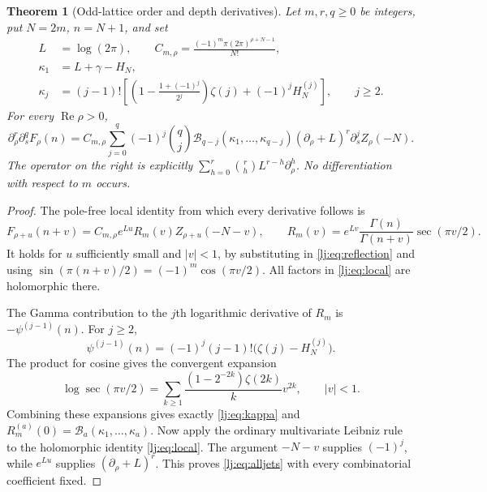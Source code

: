 \documentclass[11pt,a4paper]{article}
\numberwithin{equation}{section}
\newtheorem{theorem}{Theorem}[section]
\theoremstyle{definition}
\theoremstyle{remark}
\DeclareMathOperator{\re}{Re}
\begin{document}
\begin{theorem}[Odd-lattice order and depth derivatives]
\label{lj:thm:oddjets}
Let $m,r,q\geq0$ be integers, put $N=2m$, $n=N+1$, and set
\begin{align}
 L&=\log(2\pi),\qquad
 C_{m,\rho}=\frac{(-1)^m\pi(2\pi)^{\rho+N-1}}{N!},
 \label{lj:eq:C}\\
 \kappa_1&=L+\gamma-H_N,\nonumber\\
 \kappa_j&=(j-1)!\left[
       \left(1-\frac{1+(-1)^j}{2^j}\right)\zeta(j)
       +(-1)^jH_N^{(j)}\right],\qquad j\geq2.
 \label{lj:eq:kappa}
\end{align}
For every $\re\rho>0$,
\begin{equation}
 \boxed{\displaystyle
 \partial_\rho^r\partial_s^qF_\rho(n)
 =C_{m,\rho}\sum_{j=0}^q(-1)^j\binom qj
       \mathcal B_{q-j}(\kappa_1,\ldots,\kappa_{q-j})
       (\partial_\rho+L)^r\partial_s^jZ_\rho(-N).}
 \label{lj:eq:alljets}
\end{equation}
The operator on the right is explicitly
$\sum_{h=0}^r\binom rh L^{r-h}\partial_\rho^h$.
No differentiation with respect to $m$ occurs.
\end{theorem}

\begin{proof}
The pole-free local identity from which every derivative follows is
\begin{equation}
 F_{\rho+u}(n+v)=C_{m,\rho}e^{Lu}
       R_m(v)Z_{\rho+u}(-N-v),
 \qquad
 R_m(v)=e^{Lv}\frac{\Gamma(n)}{\Gamma(n+v)}
                  \sec(\pi v/2).
 \label{lj:eq:local}
\end{equation}
It holds for $u$ sufficiently small and $|v|<1$, by substituting in
\eqref{lj:eq:reflection} and using
$\sin(\pi(n+v)/2)=(-1)^m\cos(\pi v/2)$.
All factors in \eqref{lj:eq:local} are holomorphic there.

The Gamma contribution to the $j$th logarithmic derivative of $R_m$
is $-\psi^{(j-1)}(n)$. For $j\geq2$,
\[
 \psi^{(j-1)}(n)=(-1)^j(j-1)!
                         \bigl(\zeta(j)-H_N^{(j)}\bigr).
\]
The product for cosine gives the convergent expansion
\[
 \log\sec(\pi v/2)
   =\sum_{k\geq1}\frac{(1-2^{-2k})\zeta(2k)}{k}v^{2k},
   \qquad |v|<1.
\]
Combining these expansions gives exactly \eqref{lj:eq:kappa} and
$R_m^{(a)}(0)=\mathcal B_a(\kappa_1,\ldots,\kappa_a)$.
Now apply the ordinary multivariate Leibniz rule to the holomorphic
identity \eqref{lj:eq:local}. The argument $-N-v$ supplies $(-1)^j$,
while $e^{Lu}$ supplies $(\partial_\rho+L)^r$. This proves
\eqref{lj:eq:alljets} with every combinatorial coefficient fixed.
\end{proof}
\end{document}
